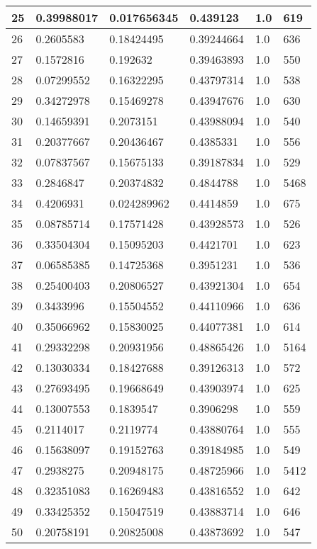 \begin{longtable}{|l|l|l|l|l|l|}
25 & 0.39988017 & 0.017656345 & 0.439123 & 1.0 & 619 \\ \hline 
26 & 0.2605583 & 0.18424495 & 0.39244664 & 1.0 & 636 \\ \hline 
27 & 0.1572816 & 0.192632 & 0.39463893 & 1.0 & 550 \\ \hline 
28 & 0.07299552 & 0.16322295 & 0.43797314 & 1.0 & 538 \\ \hline 
29 & 0.34272978 & 0.15469278 & 0.43947676 & 1.0 & 630 \\ \hline 
30 & 0.14659391 & 0.2073151 & 0.43988094 & 1.0 & 540 \\ \hline 
31 & 0.20377667 & 0.20436467 & 0.4385331 & 1.0 & 556 \\ \hline 
32 & 0.07837567 & 0.15675133 & 0.39187834 & 1.0 & 529 \\ \hline 
33 & 0.2846847 & 0.20374832 & 0.4844788 & 1.0 & 5468 \\ \hline 
34 & 0.4206931 & 0.024289962 & 0.4414859 & 1.0 & 675 \\ \hline 
35 & 0.08785714 & 0.17571428 & 0.43928573 & 1.0 & 526 \\ \hline 
36 & 0.33504304 & 0.15095203 & 0.4421701 & 1.0 & 623 \\ \hline 
37 & 0.06585385 & 0.14725368 & 0.3951231 & 1.0 & 536 \\ \hline 
38 & 0.25400403 & 0.20806527 & 0.43921304 & 1.0 & 654 \\ \hline 
39 & 0.3433996 & 0.15504552 & 0.44110966 & 1.0 & 636 \\ \hline 
40 & 0.35066962 & 0.15830025 & 0.44077381 & 1.0 & 614 \\ \hline 
41 & 0.29332298 & 0.20931956 & 0.48865426 & 1.0 & 5164 \\ \hline 
42 & 0.13030334 & 0.18427688 & 0.39126313 & 1.0 & 572 \\ \hline 
43 & 0.27693495 & 0.19668649 & 0.43903974 & 1.0 & 625 \\ \hline 
44 & 0.13007553 & 0.1839547 & 0.3906298 & 1.0 & 559 \\ \hline 
45 & 0.2114017 & 0.2119774 & 0.43880764 & 1.0 & 555 \\ \hline 
46 & 0.15638097 & 0.19152763 & 0.39184985 & 1.0 & 549 \\ \hline 
47 & 0.2938275 & 0.20948175 & 0.48725966 & 1.0 & 5412 \\ \hline 
48 & 0.32351083 & 0.16269483 & 0.43816552 & 1.0 & 642 \\ \hline 
49 & 0.33425352 & 0.15047519 & 0.43883714 & 1.0 & 646 \\ \hline 
50 & 0.20758191 & 0.20825008 & 0.43873692 & 1.0 & 547 \\ \hline 
\end{longtable}